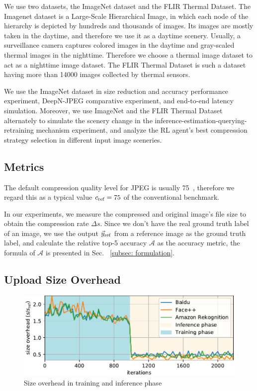 We use two datasets, the ImageNet dataset and the FLIR Thermal Dataset. The Imagenet dataset is a Large-Scale Hierarchical Image, in which each node of the hierarchy is depicted by hundreds and thousands of images. Its images are mostly taken in the daytime, and therefore we use it as a daytime scenery. Usually, a surveillance camera captures colored images in the daytime and gray-scaled thermal images in the nighttime. Therefore we choose a thermal image dataset to act as a nighttime image dataset. The FLIR Thermal Dataset is such a dataset having more than 14000 images collected by thermal sensors.

We use the ImageNet dataset in size reduction and accuracy performance experiment, DeepN-JPEG comparative experiment, and end-to-end latency simulation. Moreover, we use ImageNet and the FLIR Thermal Dataset alternately to simulate the scenery change in the inference-estimation-querying-retraining mechanism experiment, and analyze the RL agent's best compression strategy selection in different input image sceneries.

\subsection{Metrics}
\label{subsec:metrics}

The default compression quality level for JPEG is usually 75~\cite{pillow_benchmark,imgmin}, therefore we regard this as a typical value $ c_{\rm ref} = 75 $ of the conventional benchmark. %

In our experiments, we measure the compressed and original image's file size to obtain the compression rate $ \Delta s $. Since we don't have the real ground truth label of an image, we use the output $ \vec{y}_{\rm ref} $ from a reference image as the ground truth label, and calculate the relative top-5 accuracy $ \mathcal{A} $ as the accuracy metric, the formula of $ \mathcal{A} $ is presented in Sec. ~\ref{subsec: formulation}.

\subsection{Upload Size Overhead}

\begin{figure}[htbp]
    \includegraphics[width=\linewidth]{figures/train_steps_new.pdf}
    \caption{Size overhead in training and inference phase}
    \label{fig: train_steps}
\end{figure}

